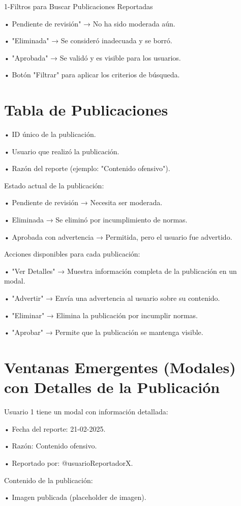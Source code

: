 \documentclass[11pt, a4paper, oneside]{book}
\begin{document}
1-Filtros para Buscar Publicaciones Reportadas



• Pendiente de revisión" → No ha sido moderada aún. 


• "Eliminada" → Se consideró inadecuada y se borró.


• "Aprobada" → Se validó y es visible para los usuarios.


• Botón "Filtrar" para aplicar los criterios de búsqueda.

\section{Tabla de Publicaciones } 


• ID único de la publicación.

• Usuario que realizó la publicación.

• Razón del reporte (ejemplo: "Contenido ofensivo").

Estado actual de la publicación:

• Pendiente de revisión → Necesita ser moderada.

• Eliminada → Se eliminó por incumplimiento de normas.

• Aprobada con advertencia → Permitida, pero el usuario fue advertido.

Acciones disponibles para cada publicación:

• "Ver Detalles" → Muestra información completa de la publicación en un modal.

• "Advertir" → Envía una advertencia al usuario sobre su contenido.

• "Eliminar" → Elimina la publicación por incumplir normas.

• "Aprobar" → Permite que la publicación se mantenga visible. 

\section{Ventanas Emergentes (Modales) con Detalles de la Publicación} 

Usuario 1 tiene un modal con información detallada:

• Fecha del reporte: 21-02-2025.

• Razón: Contenido ofensivo.

• Reportado por: @usuarioReportadorX.

Contenido de la publicación:

• Imagen publicada (placeholder de imagen).
\end{document}
